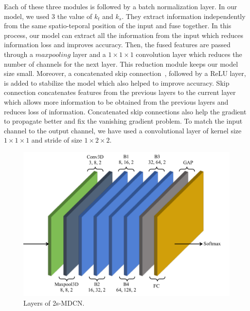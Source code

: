     Each of these three modules is followed by a batch normalization layer.
    In our model, we used $ 3 $ the value of $ {{k}_{t}} $ and $ {{k}_{s}} $.
    They extract information independently from the same spatio-teporal position of  the input and fuse together.
    In this process, our model can extract all the information from the input which reduces information loss and improves accuracy.
    Then, the 
	fused features are passed through a 
    $maxpooling$ layer and a $ {1}\times{1}\times{1} $ convolution layer which reduces the number of channels for the next layer.
    This reduction module keeps our model size small.
    Moreover, a concatenated skip connection~\cite{huang2017densely}, followed by a ReLU layer, is added to stabilize the model which also helped to improve accuracy.
    Skip connection concatenates features from the previous layers to the current layer which allows more information to be obtained from the previous layers and reduces loss of information. Concatenated skip connections also help the gradient to propagate better and fix the vanishing gradient problem.
    To match the input channel to the output channel, we have used a convolutional layer of kernel size ${1}\times{1}\times{1}$ and stride of size ${1}\times{2}\times{2}$.



	
	
	\begin{figure}[!htb]
	\centering
	\includegraphics[width=0.9\linewidth]{new_images/vio_fullnet_pdf.pdf}
	\caption{Layers of 2s-MDCN.}
	\label{fig:full_network}
	\end{figure}      
    
